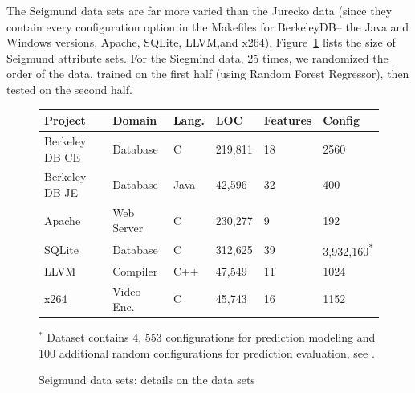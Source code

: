 \documentclass[conference]{IEEEtran}
\newcommand{\fig}[1]{Figure~\ref{fig:#1}}
\begin{document}
  The Seigmund data sets are far more varied than the Jurecko data (since they contain every configuration option in the Makefiles
  for BerkeleyDB-- the Java  and  Windows  versions,  Apache,  SQLite,  LLVM,and x264).
  \fig{cpm} lists the size of Seigmund attribute sets. For the Siegmind data, 
  25 times, 
  we randomized the order of the data, trained on the first half (using
  Random Forest Regressor), then tested on the second half.
  
  
  

 

\begin{figure}[!hbp]
  \renewcommand{\baselinestretch}{1}\begin{center}
{\scriptsize
\begin{tabular}{llllll}
  \hline
  \rowcolor{lightgray}
Project & Domain & Lang. & LOC & Features & Config\\\hline

Berkeley DB CE & Database & C & 219,811 & 18 & 2560\\

Berkeley DB JE & Database & Java & 42,596 & 32  & 400\\

Apache & Web Server & C & 230,277 & 9 & 192\\

SQLite & Database & C & 312,625 & 39 & 3,932,160\textsuperscript{*}\\

LLVM & Compiler & C++ & 47,549 & 11 & 1024\\

x264 & Video Enc. & C& 45,743 & 16 & 1152\\\hline
\end{tabular}}\par\medskip

{ \footnotesize $^*$ Dataset contains 4, 553 configurations for prediction modeling and 100 additional random configurations for prediction evaluation, see \cite{vapp}.}
\end{center}

\caption{Seigmund data sets: details on the data sets}\label{fig:cpm}
\end{figure}



  
\end{document}
